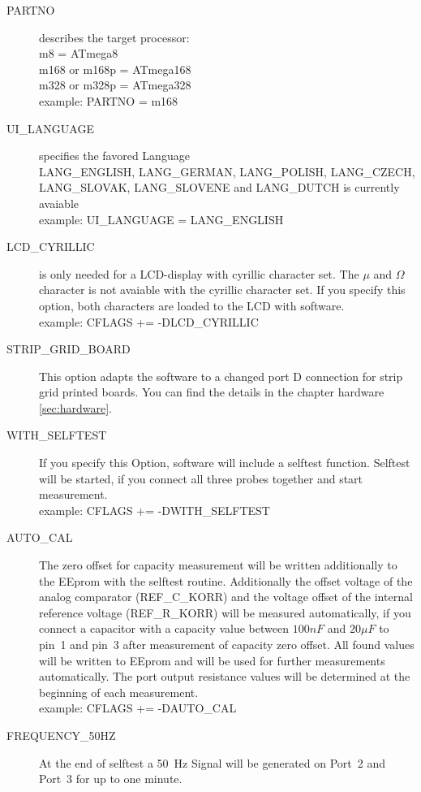 \begin{description}
  \item[PARTNO] describes the target processor:\\
         m8 = ATmega8\\
         m168 or m168p = ATmega168\\
         m328 or m328p = ATmega328\\
    example:  PARTNO = m168
  \item[UI\_LANGUAGE] specifies the favored Language\\
    LANG\_ENGLISH, LANG\_GERMAN, LANG\_POLISH, LANG\_CZECH, LANG\_SLOVAK, LANG\_SLOVENE and LANG\_DUTCH is currently avaiable \\
    example:  UI\_LANGUAGE = LANG\_ENGLISH
  \item[LCD\_CYRILLIC] is only needed for a LCD-display with cyrillic character set. The \(\mu\) and \(\Omega\) character
is not avaiable with the cyrillic character set.
If you specify this option, both characters are loaded to the LCD with software.\\
example: CFLAGS += -DLCD\_CYRILLIC
  \item[STRIP\_GRID\_BOARD] This option adapts the software to a changed port D connection for strip grid printed boards.
You can find the details in the chapter hardware \ref{sec:hardware}.
  \item[WITH\_SELFTEST] If you specify this Option, software will include a selftest function.
Selftest will be started, if you connect all three probes together and start measurement.\\
example: CFLAGS += -DWITH\_SELFTEST
  \item[AUTO\_CAL] The zero offset for capacity measurement will be written additionally
to the EEprom with the selftest routine. Additionally the offset voltage of the analog comparator (REF\_C\_KORR) and the
voltage offset of the internal reference voltage (REF\_R\_KORR) will be measured automatically, if you connect a
capacitor with a capacity value between \(100 nF\) and \(20 \mu F\) to pin~1 and pin~3 after measurement of capacity zero offset. 
All found values will be written to EEprom and will be used for further measurements automatically.
The port output resistance values will be determined at the beginning of each measurement.\\
example: CFLAGS += -DAUTO\_CAL
  \item[FREQUENCY\_50HZ] At the end of selftest a 50~Hz Signal will be generated on Port~2 and Port~3 for up to one minute.\\

\end{description}
